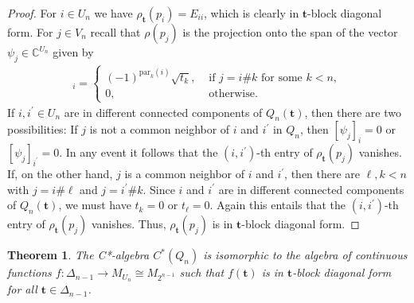 \documentclass[a4paper]{amsart}
\newcommand{\C}{\mathbb{C}}
\newtheorem{thm}{Theorem}[section]
\begin{document}
\begin{proof}
    For $i \in U_n$ we have $\rho_\mathbf{t}(p_i) = E_{ii}$, which is clearly in $\mathbf{t}$-block diagonal form. For $j \in V_n$ recall that $\rho(p_j)$ is the projection onto the span of the vector $\psi_j \in \C^{U_n}$ given by
    \begin{align*}
        [\psi_j]_i = \begin{cases}
            (-1)^{\mathrm{par}_k(i)} \sqrt{t_k}, & \text{ if } j = i \# k \text{ for some } k < n, \\
            0, & \text{ otherwise}.
        \end{cases}
    \end{align*}
    If $i, i^\prime \in U_n$ are in different connected components of $Q_n(\mathbf{t})$, then there are two possibilities: If $j$ is not a common neighbor of $i$ and $i^\prime$ in $Q_n$, then $[\psi_j]_i = 0$ or $[\psi_j]_{i^\prime} = 0$. In any event it follows that the $(i, i^\prime)$-th entry of $\rho_\mathbf{t}(p_j)$ vanishes. If, on the other hand, $j$ is a common neighbor of $i$ and $i^\prime$, then there are $\ell, k < n$ with $j = i \# \ell$ and $j = i^\prime \# k$. Since $i$ and $i^\prime$ are in different connected components of $Q_n(\mathbf{t})$, we must have $t_k = 0$ or $t_\ell = 0$. Again this entails that the $(i, i^\prime)$-th entry of $\rho_\mathbf{t}(p_j)$ vanishes.
    Thus, $\rho_\mathbf{t}(p_j)$ is in $\mathbf{t}$-block diagonal form.
\end{proof}

\begin{thm}
    \label{hyp::thm:hypercube_cstar_algebras_as_continuous_functions}
    The C*-algebra $C^\ast(Q_n)$ is isomorphic to the algebra of continuous functions $f: \Delta_{n-1} \to M_{U_n} \cong M_{2^{n-1}}$ such that $f(\mathbf{t})$ is in $\mathbf{t}$-block diagonal form for all $\mathbf{t} \in \Delta_{n-1}$.
\end{thm}
\end{document}
